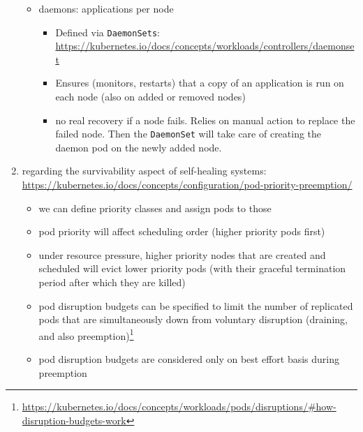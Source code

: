 \begin{enumerate}
\begin{itemize}
            \item daemons: applications per node
              \begin{itemize}
                \item Defined via \texttt{DaemonSets}: \url{https://kubernetes.io/docs/concepts/workloads/controllers/daemonset}
                \item Ensures (monitors, restarts) that a copy of an application is run on each node (also on added or removed nodes)
                \item no real recovery if a node fails. Relies on manual action to replace the failed node. Then the \texttt{DaemonSet} will take care of creating the daemon pod on the newly added node.
              \end{itemize}
          \end{itemize}
    \item regarding the survivability aspect of self-healing systems: \url{https://kubernetes.io/docs/concepts/configuration/pod-priority-preemption/}
      \begin{itemize}
        \item we can define priority classes and assign pods to those
        \item pod priority will affect scheduling order (higher priority pods first)
        \item under resource pressure, higher priority nodes that are created and scheduled will evict lower priority pods (with their graceful termination period after which they are killed)
        \item pod disruption budgets can be specified to limit the number of replicated pods that are simultaneously down from voluntary disruption (draining, and also preemption)\footnote{\url{https://kubernetes.io/docs/concepts/workloads/pods/disruptions/\#how-disruption-budgets-work}}
        \item pod disruption budgets are considered only on best effort basis during preemption
      \end{itemize}
  \end{enumerate}